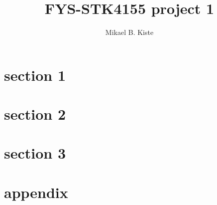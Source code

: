 \documentclass[]{report}
\author{Mikael B. Kiste}
\title{FYS-STK4155 project 1}
\begin{document}
	\maketitle
	\tableofcontents
	\newpage
	\section{section 1}
	\section{section 2}
	\section{section 3}

	\newpage
	\appendix
	\section{appendix}
\end{document}
